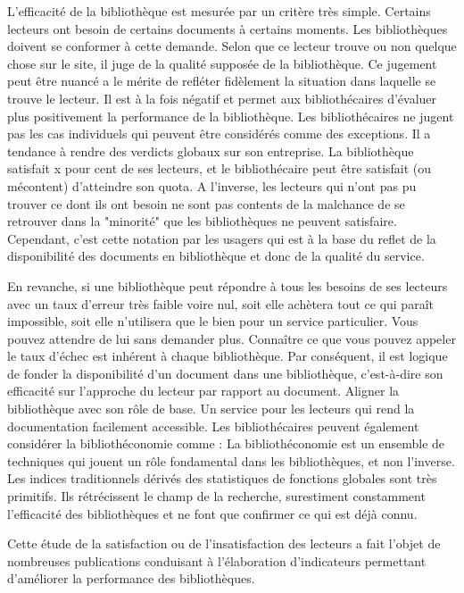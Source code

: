 \documentclass[french,a4paper,12pt]{article}
\begin{document}
\quad L'efficacité de la bibliothèque est mesurée par un critère très simple. Certains lecteurs ont besoin de certains documents à certains moments. Les bibliothèques doivent se conformer à cette demande. Selon que ce lecteur trouve ou non quelque chose sur le site, il juge de la qualité supposée de la bibliothèque. Ce jugement peut être nuancé a le mérite de refléter fidèlement la situation dans laquelle se trouve le lecteur. Il est à la fois négatif et permet aux bibliothécaires d'évaluer plus positivement la performance de la bibliothèque. Les bibliothécaires ne jugent pas les cas individuels qui peuvent être considérés comme des exceptions. Il a tendance à rendre des verdicts globaux sur son entreprise. La bibliothèque satisfait x pour cent de ses lecteurs, et le bibliothécaire peut être satisfait (ou mécontent) d'atteindre son quota. A l'inverse, les lecteurs qui n'ont pas pu trouver ce dont ils ont besoin ne sont pas contents de la malchance de se retrouver dans la "minorité" que les bibliothèques ne peuvent satisfaire. Cependant, c'est cette notation par les usagers qui est à la base du reflet de la disponibilité des documents en bibliothèque et donc de la qualité du service.


\quad En revanche, si une bibliothèque peut répondre à tous les besoins de ses lecteurs avec un taux d'erreur très faible voire nul, soit elle achètera tout ce qui paraît impossible, soit elle n'utilisera que le bien pour un service particulier. Vous pouvez attendre de lui sans demander plus. Connaître ce que vous pouvez appeler le taux d'échec est inhérent à chaque bibliothèque. Par conséquent, il est logique de fonder la disponibilité d'un document dans une bibliothèque, c'est-à-dire son efficacité sur l'approche du lecteur par rapport au document. Aligner la bibliothèque avec son rôle de base. Un service pour les lecteurs qui rend la documentation facilement accessible. Les bibliothécaires peuvent également considérer la bibliothéconomie comme : La bibliothéconomie est un ensemble de techniques qui jouent un rôle fondamental dans les bibliothèques, et non l'inverse. Les indices traditionnels dérivés des statistiques de fonctions globales sont très primitifs. Ils rétrécissent le champ de la recherche, surestiment constamment l'efficacité des bibliothèques et ne font que confirmer ce qui est déjà connu.

 \quad Cette étude de la satisfaction ou de l'insatisfaction des lecteurs a fait l'objet de nombreuses publications conduisant à l'élaboration d'indicateurs permettant d'améliorer la performance des bibliothèques.
 
\end{document}
